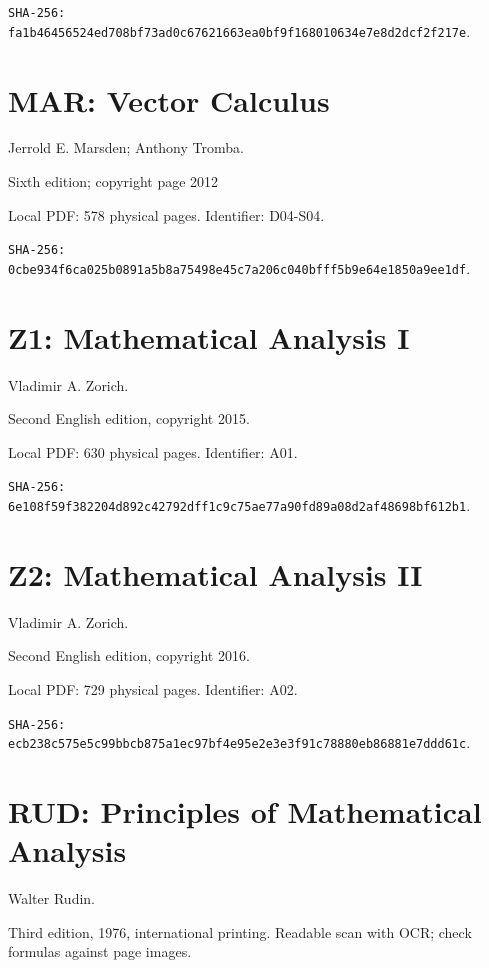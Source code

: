 \documentclass[11pt,oneside,openany]{book}
\theoremstyle{definition}
\theoremstyle{remark}
\begin{document}
\par\noindent\texttt{SHA-256: fa1b46456524ed708bf73ad0c6762166\allowbreak 3ea0bf9f168010634e7e8d2dcf2f217e}.

\section*{MAR: Vector Calculus}

Jerrold E. Marsden; Anthony Tromba.

Sixth edition; copyright page 2012

Local PDF: 578 physical pages. Identifier: D04-S04.

\par\noindent\texttt{SHA-256: 0cbe934f6ca025b0891a5b8a75498e45\allowbreak c7a206c040bfff5b9e64e1850a9ee1df}.

\section*{Z1: Mathematical Analysis I}

Vladimir A. Zorich.

Second English edition, copyright 2015.

Local PDF: 630 physical pages. Identifier: A01.

\par\noindent\texttt{SHA-256: 6e108f59f382204d892c42792dff1c9c\allowbreak 75ae77a90fd89a08d2af48698bf612b1}.

\section*{Z2: Mathematical Analysis II}

Vladimir A. Zorich.

Second English edition, copyright 2016.

Local PDF: 729 physical pages. Identifier: A02.

\par\noindent\texttt{SHA-256: ecb238c575e5c99bbcb875a1ec97bf4e\allowbreak 95e2e3e3f91c78880eb86881e7ddd61c}.

\section*{RUD: Principles of Mathematical Analysis}

Walter Rudin.

Third edition, 1976, international printing. Readable scan with OCR; check formulas against page images.
\end{document}
